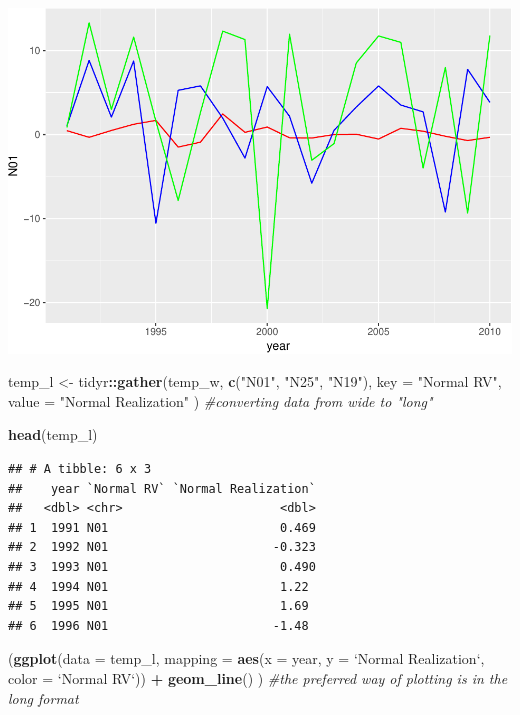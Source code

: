 \documentclass[]{article}
\newenvironment{Shaded}{\begin{snugshade}}{\end{snugshade}}
\newcommand{\KeywordTok}[1]{\textcolor[rgb]{0.13,0.29,0.53}{\textbf{#1}}}
\newcommand{\DataTypeTok}[1]{\textcolor[rgb]{0.13,0.29,0.53}{#1}}
\newcommand{\StringTok}[1]{\textcolor[rgb]{0.31,0.60,0.02}{#1}}
\newcommand{\CommentTok}[1]{\textcolor[rgb]{0.56,0.35,0.01}{\textit{#1}}}
\newcommand{\OperatorTok}[1]{\textcolor[rgb]{0.81,0.36,0.00}{\textbf{#1}}}
\newcommand{\NormalTok}[1]{#1}
\begin{document}
\includegraphics{Intro_ggplot_files/figure-latex/wide_vs_long-1.pdf}

\begin{Shaded}
\begin{Highlighting}[]
\NormalTok{temp_l <-}\StringTok{ }\NormalTok{tidyr}\OperatorTok{::}\KeywordTok{gather}\NormalTok{(temp_w, }\KeywordTok{c}\NormalTok{(}\StringTok{"N01"}\NormalTok{, }\StringTok{"N25"}\NormalTok{, }\StringTok{"N19"}\NormalTok{), }
                        \DataTypeTok{key =} \StringTok{"Normal RV"}\NormalTok{, }
                        \DataTypeTok{value =} \StringTok{"Normal Realization"}
\NormalTok{                        ) }\CommentTok{#converting data from wide to "long"}

\KeywordTok{head}\NormalTok{(temp_l)}
\end{Highlighting}
\end{Shaded}

\begin{verbatim}
## # A tibble: 6 x 3
##    year `Normal RV` `Normal Realization`
##   <dbl> <chr>                      <dbl>
## 1  1991 N01                        0.469
## 2  1992 N01                       -0.323
## 3  1993 N01                        0.490
## 4  1994 N01                        1.22 
## 5  1995 N01                        1.69 
## 6  1996 N01                       -1.48
\end{verbatim}

\begin{Shaded}
\begin{Highlighting}[]
\NormalTok{(}\KeywordTok{ggplot}\NormalTok{(}\DataTypeTok{data =}\NormalTok{ temp_l,}
        \DataTypeTok{mapping =} \KeywordTok{aes}\NormalTok{(}\DataTypeTok{x =}\NormalTok{ year, }
                      \DataTypeTok{y =} \StringTok{`}\DataTypeTok{Normal Realization}\StringTok{`}\NormalTok{,}
                      \DataTypeTok{color =} \StringTok{`}\DataTypeTok{Normal RV}\StringTok{`}\NormalTok{)) }\OperatorTok{+}
\StringTok{    }\KeywordTok{geom_line}\NormalTok{()}
\NormalTok{  ) }\CommentTok{#the preferred way of plotting is in the long format}
\end{Highlighting}
\end{Shaded}
\end{document}
